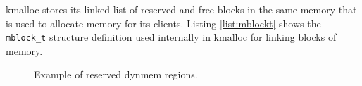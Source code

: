 kmalloc stores its linked list of reserved and free blocks in the same memory
that is used to allocate memory for its clients. Listing \ref{list:mblockt}
shows the \verb+mblock_t+ structure definition used internally in kmalloc for
linking blocks of memory.

\begin{figure}
  
  \centering
  \caption{Example of reserved dynmem regions.}
  \label{figure:dynmem_blocks}
\end{figure}







